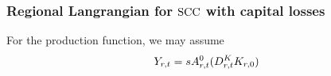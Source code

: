 \documentclass[preprint,3p,authoryear]{elsarticle}
\begin{document}
 \subsubsection{Regional Langrangian for $\operatorname{SCC}$ with capital losses}
\label{sec:LKAreg}
For the production function, we may assume
\begin{equation*}
  Y_{r,t}=s A_{r,t}^0 (D^K_{r,t}K_{r,0})
\end{equation*}
\end{document}
